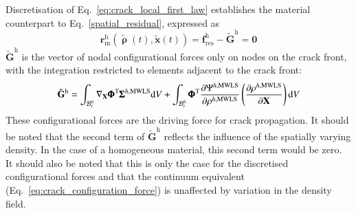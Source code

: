 \documentclass[review]{elsarticle}
\numberwithin{equation}{section}
\begin{document}
Discretisation of Eq.~\ref{eq:crack_local_first_law} establishes the material counterpart to Eq.~\ref{spatial_residual}, expressed as
\begin{equation}
\label{material_residual}
\mathbf{r}_\textrm{m}^\textrm{h}(\tilde{\pmb\uprho}(t), \tilde{\mathbf{x}}(t)) = \mathbf{f}^\textrm{h}_\textrm{res}-\tilde{\mathbf{G}}^\textrm{h}=\mathbf{0}
\end{equation}
$\tilde{\mathbf{G}}^\textrm{h}$ is the vector of nodal configurational forces only on nodes on the crack front, with the integration restricted to elements adjacent to the crack front:
\begin{equation}
	\tilde{\mathbf{G}}^\textrm{h} = 
	\int_{\mathcal{B}^h_t}
		\nabla_\mathbf{X}\pmb{\Phi}^\textrm{T} {\pmb\Sigma}^{h,\textrm{MWLS}}
	\textrm{d}V
	+
	\int_{\mathcal{B}^h_t}
		\pmb{\Phi}^\textrm{T} \dfrac{\partial {\Psi}^{h,\textrm{MWLS}} }{\partial \rho^{h,\rm{MWLS}}}
		\left(
			\frac{\partial 
			\rho^{h,\textrm{MWLS}}}{\partial \mathbf{X}}
		\right)
	\textrm{d}V
	\label{eq:mat_int_front}
\end{equation}
These configurational forces are the driving force for crack propagation. It should be noted that the second term of $\tilde{\mathbf{G}}^\textrm{h}$ reflects the influence of the spatially varying density. In the case of a homogeneous material, this second term would be zero. It should also be noted that this is only the case for the discretised configurational forces and that the continuum equivalent (Eq.~\ref{eq:crack_configuration_force}) is unaffected by variation in the density field.
\end{document}
